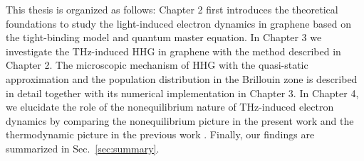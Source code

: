 This thesis is organized as follows: Chapter 2 first introduces the theoretical foundations to study the light-induced electron dynamics in graphene based on the tight-binding model and quantum master equation. In Chapter 3 we investigate the THz-induced HHG in graphene with the method described in Chapter 2. The microscopic mechanism of HHG with the quasi-static approximation and the population distribution in the Brillouin zone is described in detail together with its numerical implementation in Chapter 3. In Chapter 4, we elucidate the role of the nonequilibrium nature of THz-induced electron dynamics by comparing the nonequilibrium picture in the present work and the thermodynamic picture in the previous work \cite{mics2015thermodynamic}. Finally, our findings are summarized in Sec.~\ref{sec:summary}.